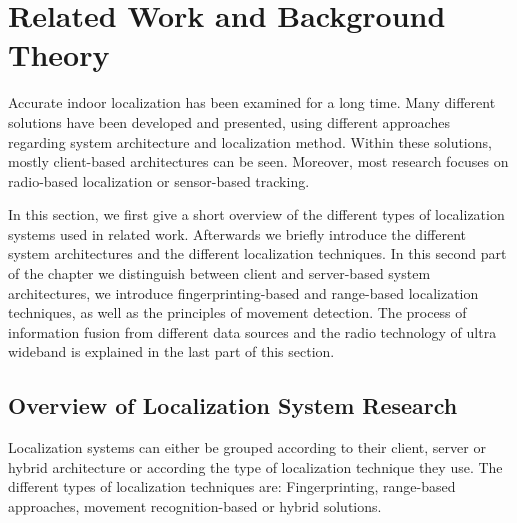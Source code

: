 
\chapter{Related Work and Background Theory} %

\label{Chapter2} %
Accurate indoor localization has been examined for a long time. Many different solutions have been developed and presented, using different approaches regarding system architecture and localization method. Within these solutions, mostly client-based architectures can be seen. Moreover, most research focuses on radio-based localization or sensor-based tracking.

In this section, we first give a short overview of the different types of localization systems used in related work. Afterwards we briefly introduce the different system architectures and the different localization techniques. In this second part of the chapter we distinguish between client and server-based system architectures, we introduce fingerprinting-based and range-based localization techniques, as well as the principles of movement detection. The process of information fusion from different data sources and the radio technology of ultra wideband is explained in the last part of this section.

\section{Overview of Localization System Research}
Localization systems can either be grouped according to their client, server or hybrid architecture or according the type of localization technique they use. The different types of localization techniques are: Fingerprinting, range-based approaches, movement recognition-based or hybrid solutions. 

